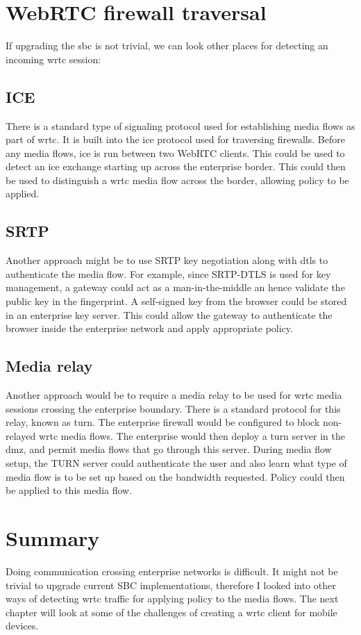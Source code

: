 \section{WebRTC firewall traversal}
If upgrading the \gls{sbc} is not trivial, we can look other places for detecting an incoming \gls{wrtc} session:

\subsection{ICE}
There is a standard type of signaling protocol used for establishing media flows as part of \gls{wrtc}. It is built into the \gls{ice} protocol used for traversing firewalls. Before any media flows, \gls{ice} is run between two WebRTC clients. This could be used to detect an \gls{ice} exchange starting up across the enterprise border. This could then be used to distinguish a \gls{wrtc} media flow across the border, allowing policy to be applied.

\subsection{SRTP}
Another approach might be to use SRTP key negotiation along with \gls{dtls} to authenticate the media flow. For example, since SRTP-DTLS is used for key management, a gateway could act as a man-in-the-middle an hence validate the public key in the fingerprint. A self-signed key from the browser could be stored in an enterprise key server. This could allow the gateway to authenticate the browser inside the enterprise network and apply appropriate policy.

\subsection{Media relay}
Another approach would be to require a media relay to be used for \gls{wrtc} media sessions crossing the enterprise boundary. There is a standard protocol for this relay, known as \gls{turn}. The enterprise firewall would be configured to block non-relayed \gls{wrtc} media flows. The enterprise would then deploy a \gls{turn} server in the \gls{dmz}, and permit media flows that go through this server. During media flow setup, the TURN server could authenticate the user and also learn what type of media flow is to be set up based on the bandwidth requested. Policy could then be applied to this media flow.

\section{Summary}
Doing communication crossing enterprise networks is difficult. It might not be trivial to upgrade current SBC implementations, therefore I looked into other ways of detecting \gls{wrtc} traffic for applying policy to the media flows. The next chapter will look at some of the challenges of creating a \gls{wrtc} client for mobile devices.